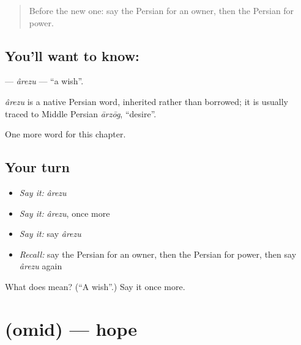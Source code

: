 \label{lesson:FA-C90-arezu}



\begin{quote}
Before the new one: say the Persian for an owner, then the Persian for power.
\end{quote}

\subsection*{You'll want to know: }
\textbf{} — \emph{ârezu} — \textquotedblleft{}a wish\textquotedblright{}.

\begin{cousinweb}
\emph{ârezu} is a native Persian word, inherited rather than borrowed; it is usually traced to Middle Persian \emph{ārzōg}, \textquotedblleft{}desire\textquotedblright{}.
\end{cousinweb}

\begin{grammarlens}[title={What you've built}]
One more word for this chapter.
\end{grammarlens}

\subsection*{Your turn}
\begin{itemize}
\raggedright
  \item \emph{Say it:} \emph{ârezu}
  \item \emph{Say it:} \emph{ârezu}, once more
  \item \emph{Say it:} say \emph{ârezu}
  \item \emph{Recall:} say the Persian for an owner, then the Persian for power, then say \emph{ârezu} again
\end{itemize}

\begin{tcolorbox}[breakable,colback=teal!4,colframe=teal!35!black,title={Before you move on}]
What does  mean? (\textquotedblleft{}A wish\textquotedblright{}.) Say it once more.
\end{tcolorbox}
\section[\texorpdfstring{\fa{امید} (omid)}{امید (omid)}]{ (omid) — hope}

\label{lesson:FA-C90-omid}



